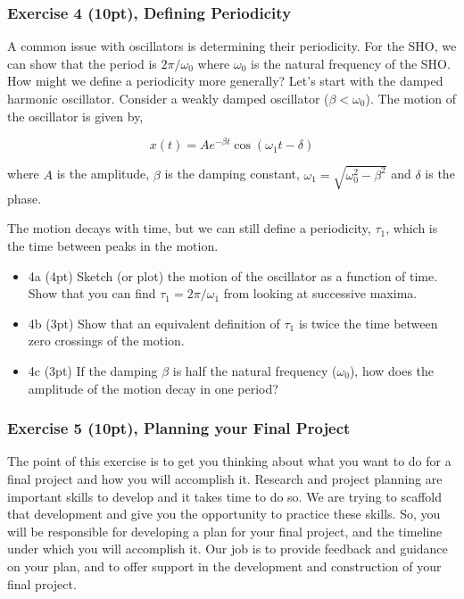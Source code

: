 \documentclass[11pt]{article}
\providecommand{\tightlist}{%
      \setlength{\itemsep}{0pt}\setlength{\parskip}{0pt}}
\begin{document}
    \subsubsection{Exercise 4 (10pt), Defining
Periodicity}\label{exercise-4-10pt-defining-periodicity}

A common issue with oscillators is determining their periodicity. For
the SHO, we can show that the period is \(2\pi/\omega_0\) where
\(\omega_0\) is the natural frequency of the SHO. How might we define a
periodicity more generally? Let's start with the damped harmonic
oscillator. Consider a weakly damped oscillator (\(\beta < \omega_0\)).
The motion of the oscillator is given by,

\[x(t) = A e^{-\beta t}\cos(\omega_1 t - \delta)\]

where \(A\) is the amplitude, \(\beta\) is the damping constant,
\(\omega_1 = \sqrt{\omega_0^2 - \beta^2}\) and \(\delta\) is the phase.

The motion decays with time, but we can still define a periodicity,
\(\tau_1\), which is the time between peaks in the motion.

\begin{itemize}
\tightlist
\item
  4a (4pt) Sketch (or plot) the motion of the oscillator as a function
  of time. Show that you can find \(\tau_1 = 2\pi/\omega_1\) from
  looking at successive maxima.
\item
  4b (3pt) Show that an equivalent definition of \(\tau_1\) is twice the
  time between zero crossings of the motion.
\item
  4c (3pt) If the damping \(\beta\) is half the natural frequency
  (\(\omega_0\)), how does the amplitude of the motion decay in one
  period?
\end{itemize}

    \subsubsection{Exercise 5 (10pt), Planning your Final
Project}\label{exercise-5-10pt-planning-your-final-project}

The point of this exercise is to get you thinking about what you want to
do for a final project and how you will accomplish it. Research and
project planning are important skills to develop and it takes time to do
so. We are trying to scaffold that development and give you the
opportunity to practice these skills. So, you will be responsible for
developing a plan for your final project, and the timeline under which
you will accomplish it. Our job is to provide feedback and guidance on
your plan, and to offer support in the development and construction of
your final project.
\end{document}
